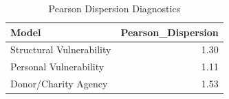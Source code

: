 \begin{table}[ht]
\centering
\begin{tabular}{lr}
  \hline
Model & Pearson\_Dispersion \\ 
  \hline
Structural Vulnerability & 1.30 \\ 
  Personal Vulnerability & 1.11 \\ 
  Donor/Charity Agency & 1.53 \\ 
   \hline
\end{tabular}
\caption{Pearson Dispersion Diagnostics} 
\end{table}
